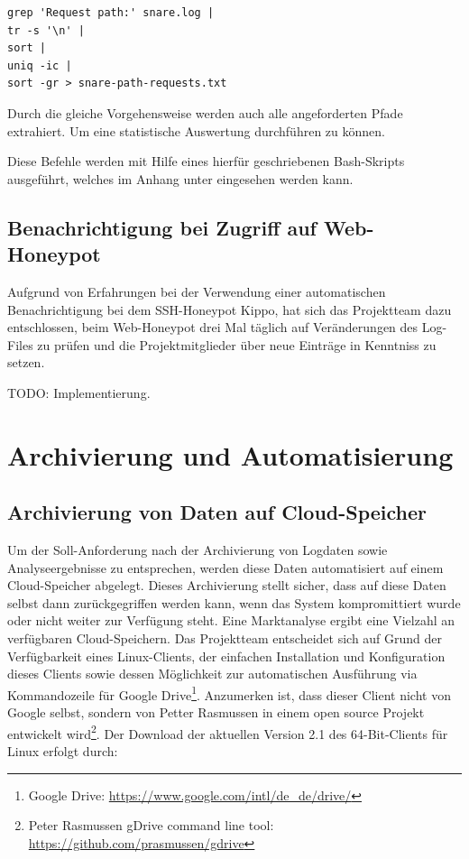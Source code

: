 \begin{lstlisting}[style=customc]
grep 'Request path:' snare.log |
tr -s '\n' |
sort |
uniq -ic |
sort -gr > snare-path-requests.txt
\end{lstlisting}

Durch die gleiche Vorgehensweise werden auch alle angeforderten Pfade extrahiert. Um eine statistische Auswertung durchführen zu können.

Diese Befehle werden mit Hilfe eines hierfür geschriebenen Bash-Skripts ausgeführt, welches im Anhang unter \textit{} eingesehen werden kann.


\subsection{Benachrichtigung bei Zugriff auf Web-Honeypot}
\label{subsec:Installation und Konfiguration SNARE}

Aufgrund von Erfahrungen bei der Verwendung einer automatischen Benachrichtigung bei dem SSH-Honeypot Kippo, hat sich das Projektteam dazu entschlossen, beim Web-Honeypot drei Mal täglich auf Veränderungen des Log-Files zu prüfen und die Projektmitglieder über neue Einträge in Kenntniss zu setzen.

TODO: Implementierung.

\section{Archivierung und Automatisierung}
\label{sec:Archivierung und Automatisierung}


\subsection{Archivierung von Daten auf Cloud-Speicher}
\label{subsec:Archivierung von Daten auf Cloud-Speicher}

Um der Soll-Anforderung nach der Archivierung von Logdaten sowie Analyseergebnisse zu entsprechen, werden diese Daten automatisiert auf einem Cloud-Speicher abgelegt. Dieses Archivierung stellt sicher, dass auf diese Daten selbst dann zurückgegriffen werden kann, wenn das System kompromittiert wurde oder nicht weiter zur Verfügung steht. Eine Marktanalyse ergibt eine Vielzahl an verfügbaren Cloud-Speichern. Das Projektteam entscheidet sich auf Grund der Verfügbarkeit eines Linux-Clients, der einfachen Installation und Konfiguration dieses Clients sowie dessen Möglichkeit zur automatischen Ausführung via Kommandozeile für Google Drive\footnote{ Google Drive: \url{https://www.google.com/intl/de_de/drive/}}. Anzumerken ist, dass dieser Client nicht von Google selbst, sondern von Petter Rasmussen in einem open source Projekt entwickelt wird\footnote{ Peter Rasmussen gDrive command line tool: \url{https://github.com/prasmussen/gdrive}}. Der Download der aktuellen Version 2.1 des 64-Bit-Clients für Linux erfolgt durch:

